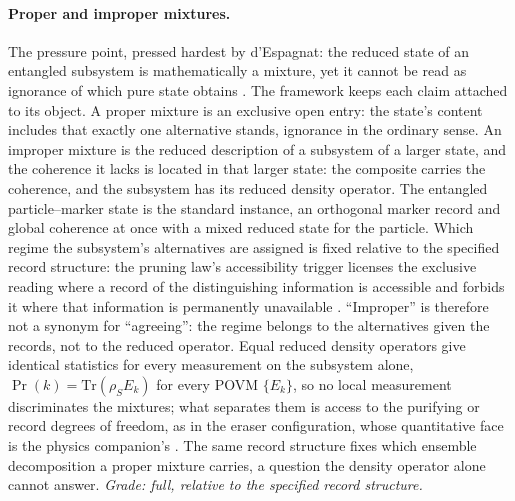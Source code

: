 \paragraph{Proper and improper mixtures.} The pressure point, pressed hardest by d'Espagnat: the reduced state of an entangled subsystem is mathematically a mixture, yet it cannot be read as ignorance of which pure state obtains \cite{despagnat1976conceptual}. The framework keeps each claim attached to its object. A proper mixture is an exclusive open entry: the state's content includes that exactly one alternative stands, ignorance in the ordinary sense. An improper mixture is the reduced description of a subsystem of a larger state, and the coherence it lacks is located in that larger state: the composite carries the coherence, and the subsystem has its reduced density operator. The entangled particle--marker state is the standard instance, an orthogonal marker record and global coherence at once with a mixed reduced state for the particle. Which regime the subsystem's alternatives are assigned is fixed relative to the specified record structure: the pruning law's accessibility trigger licenses the exclusive reading where a record of the distinguishing information is accessible and forbids it where that information is permanently unavailable \cite{Aethus}. ``Improper'' is therefore not a synonym for ``agreeing'': the regime belongs to the alternatives given the records, not to the reduced operator. Equal reduced density operators give identical statistics for every measurement on the subsystem alone, $\Pr(k) = \mathrm{Tr}(\rho_S E_k)$ for every POVM $\{E_k\}$, so no local measurement discriminates the mixtures; what separates them is access to the purifying or record degrees of freedom, as in the eraser configuration, whose quantitative face is the physics companion's \cite{AethusQuant}. The same record structure fixes which ensemble decomposition a proper mixture carries, a question the density operator alone cannot answer. \emph{Grade: full, relative to the specified record structure.}

\printbibliography

